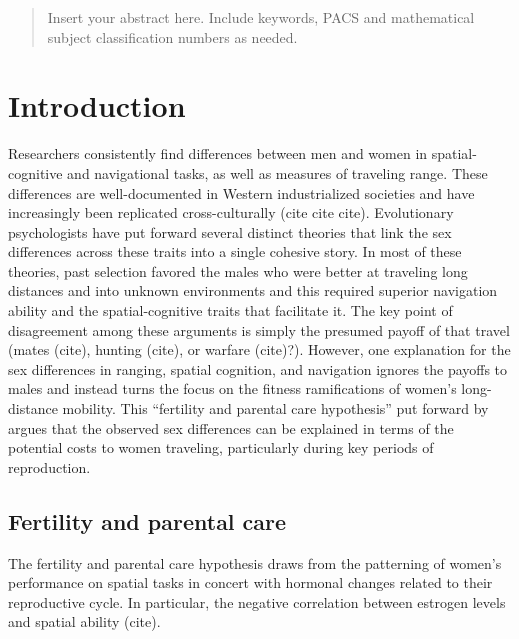 \date{Received: date / Accepted: date}


\maketitle

\begin{abstract}
Insert your abstract here. Include keywords, PACS and mathematical
subject classification numbers as needed.
\end{abstract}

\section{Introduction}
\label{sec:1}
Researchers consistently find differences between men and women in spatial-cognitive and navigational tasks, as well as measures of traveling range.  These differences are well-documented in Western industrialized societies and have increasingly been replicated cross-culturally (cite cite cite).  Evolutionary psychologists have put forward several distinct theories that link the sex differences across these traits into a single cohesive story.  In most of these theories, past selection favored the males who were better at traveling long distances and into unknown environments and this required superior navigation ability and the spatial-cognitive traits that facilitate it.  The key point of disagreement among these arguments is simply the presumed payoff of that travel (mates (cite), hunting (cite), or warfare (cite)?).  However, one explanation for the sex differences in ranging, spatial cognition, and navigation ignores the payoffs to males and instead turns the focus on the fitness ramifications of women's long-distance mobility.  This ``fertility and parental care hypothesis'' put forward by \cite{sherry1997evolution} argues that the observed sex differences can be explained in terms of the potential costs to women traveling, particularly during key periods of reproduction.

	\subsection{Fertility and parental care}
	\label{sec:1.1}
The fertility and parental care hypothesis draws from the patterning of women's performance on spatial tasks in concert with hormonal changes related to their reproductive cycle.  In particular, the negative correlation between estrogen levels and spatial ability (cite).  
	
